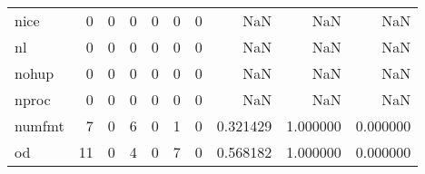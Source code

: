 \begin{longtable}{lrrrrrrrrr}
nice      &                                                  0 &                                                  0 &                                                  0 &                                                  0 &                                                  0 &                                                  0 &                                                NaN &                                    NaN &                                  NaN \\
nl        &                                                  0 &                                                  0 &                                                  0 &                                                  0 &                                                  0 &                                                  0 &                                                NaN &                                    NaN &                                  NaN \\
nohup     &                                                  0 &                                                  0 &                                                  0 &                                                  0 &                                                  0 &                                                  0 &                                                NaN &                                    NaN &                                  NaN \\
nproc     &                                                  0 &                                                  0 &                                                  0 &                                                  0 &                                                  0 &                                                  0 &                                                NaN &                                    NaN &                                  NaN \\
numfmt    &                                                  7 &                                                  0 &                                                  6 &                                                  0 &                                                  1 &                                                  0 &                                           0.321429 &                               1.000000 &                             0.000000 \\
od        &                                                 11 &                                                  0 &                                                  4 &                                                  0 &                                                  7 &                                                  0 &                                           0.568182 &                               1.000000 &                             0.000000 \\

\end{longtable}
